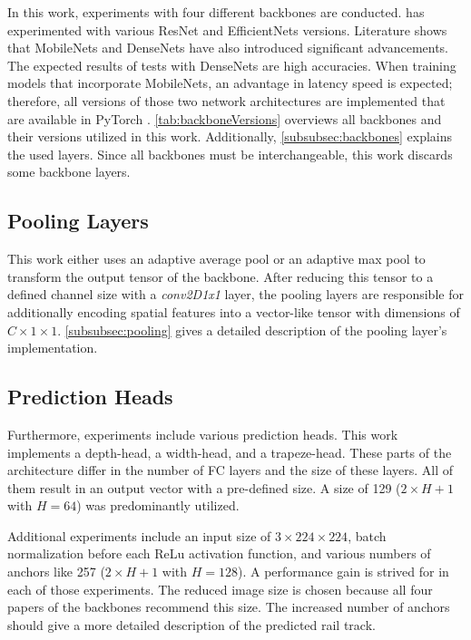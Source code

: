 In this work, experiments with four different backbones are conducted.
\cite{tepNet2024} has experimented with various ResNet and EfficientNets versions.
Literature shows that MobileNets and DenseNets have also introduced significant advancements.
The expected results of tests with DenseNets are high accuracies.
When training models that incorporate MobileNets, an advantage in latency speed is expected;
therefore, all versions of those two network architectures are implemented that are available in PyTorch \cite{pytorchmobilenetv3} \cite{pytorchdensenet}.
\autoref{tab:backboneVersions} overviews all backbones and their versions utilized in this work.
Additionally, \autoref{subsubsec:backbones} explains the used layers.
Since all backbones must be interchangeable, this work discards some backbone layers.

\subsection{Pooling Layers}

This work either uses an adaptive average pool or an adaptive max pool to transform the output tensor of the backbone.
After reducing this tensor to a defined channel size with a \textit{conv2D1x1} layer, the pooling layers are responsible for additionally encoding spatial features into a vector-like tensor with dimensions of $C \times 1 \times 1$.
\autoref{subsubsec:pooling} gives a detailed description of the pooling layer's implementation.

\subsection{Prediction Heads}

Furthermore, experiments include various prediction heads.
This work implements a depth-head, a width-head, and a trapeze-head.
These parts of the architecture differ in the number of \ac{FC} layers and the size of these layers.
All of them result in an output vector with a pre-defined size.
A size of 129 ($2 \times H + 1$ with $H = 64$) was predominantly utilized.

\vspace{1cm}

Additional experiments include an input size of $3 \times 224 \times 224$, batch normalization before each ReLu activation function, and various numbers of anchors like 257 ($2 \times H + 1$ with $H = 128$).
A performance gain is strived for in each of those experiments.
The reduced image size is chosen because all four papers of the backbones recommend this size.
The increased number of anchors should give a more detailed description of the predicted rail track.